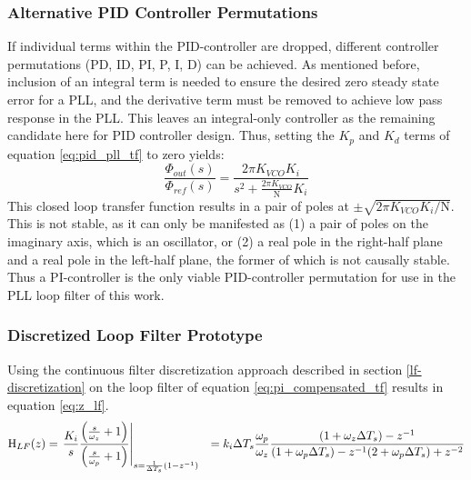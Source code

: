		\subsubsection{Alternative PID Controller Permutations} \label{other_pid}
			If individual terms within the PID-controller are dropped, different controller permutations (PD, ID, PI, P, I, D) can be achieved. As mentioned before, inclusion of an integral term is needed to ensure the desired zero steady state error for a PLL, and the derivative term must be removed to achieve low pass response in the PLL. This leaves an integral-only controller as the remaining candidate here for PID controller design. Thus, setting the $K_p$ and $K_d$ terms of equation \ref{eq:pid_pll_tf} to zero yields:
			\begin{equation}
				\frac{\Phi_{out}(s)}{\Phi_{ref}(s)} = \frac{2\pi K_{VCO}K_i}{s^2 + \frac{2\pi K_{VCO}}{\mathrm{N}}K_i}
			\end{equation}
			This closed loop transfer function results in a pair of poles at $\pm\sqrt{2\pi K_{VCO}K_i/\mathrm{N}}$. This is not stable, as it can only be manifested as (1) a pair of poles on the imaginary axis, which is an oscillator, or (2) a real pole in the right-half plane and a real pole in the left-half plane, the former of which is not causally stable. Thus a PI-controller is the only viable PID-controller permutation for use in the PLL loop filter of this work. 


	\subsubsection{Discretized Loop Filter Prototype}\label{disc_lf_comp_pi}
		Using the continuous filter discretization approach described in section \ref{lf-discretization} on the loop filter of equation \ref{eq:pi_compensated_tf} results in equation \ref{eq:z_lf}.
		\begin{align}
			\textnormal{H}_{LF}(z) & = \left.\frac{K_i}{s}\frac{\left(\frac{s}{\omega_z} + 1\right)}{\left(\frac{s}{\omega_p} + 1\right)}\right\vert_{s=\frac{1}{\Delta T_s}(1-z^{-1})}
			&= k_i\Delta T_s\frac{\omega_p}{\omega_z}\frac{(1+\omega_z\Delta T_s)-z^{-1}}{(1+\omega_p\Delta T_s) - z^{-1}(2+\omega_p\Delta T_s) + z^{-2}}\label{eq:z_lf}
		\end{align}

